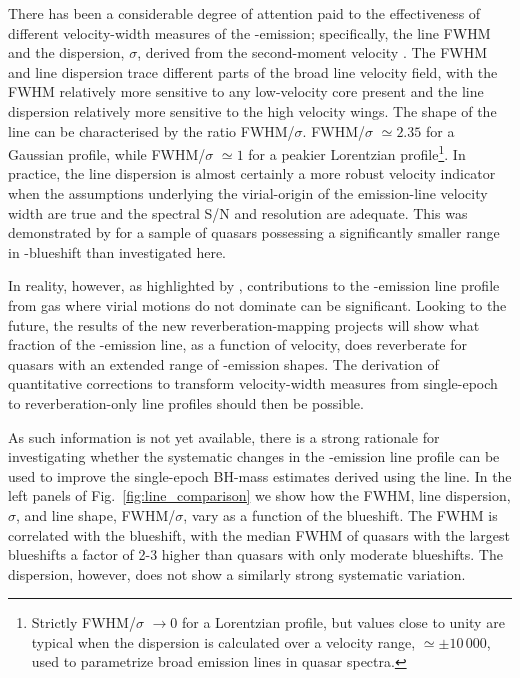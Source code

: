 There has been a considerable degree of attention paid to the effectiveness of different velocity-width measures of the -emission; specifically, the line FWHM and the dispersion, $\sigma$, derived from the second-moment velocity \citep[e.g.][]{assef11, denney13}.
The FWHM and line dispersion trace different parts of the broad line velocity field, with the FWHM relatively more sensitive to any low-velocity core present and the line dispersion relatively more sensitive to the high velocity wings. 
The shape of the line can be characterised by the ratio FWHM/$\sigma$. 
FWHM/$\sigma$ $\simeq 2.35$ for a Gaussian profile, while FWHM/$\sigma$ $\simeq 1$ for a peakier Lorentzian profile\footnote{Strictly FWHM/$\sigma$ $\rightarrow 0$ for a Lorentzian profile, but values close to unity are typical when the dispersion is calculated over a velocity range, $\simeq\pm10\,000$\kms, used to parametrize broad emission lines in quasar spectra.}.
In practice, the line dispersion is almost certainly a more robust velocity indicator when the assumptions underlying the virial-origin of the emission-line velocity width are true and the spectral S/N and resolution are adequate.
This was demonstrated by \citet{denney13} for a sample of quasars possessing a significantly smaller range in -blueshift than investigated here.

In reality, however, as highlighted by \citet{denney12}, contributions to the -emission line profile from gas where virial motions do not dominate can be significant. 
Looking to the future, the results of the new reverberation-mapping projects \citep{shen15, kingoz15} will show what fraction of the -emission line, as a function of velocity, does reverberate for quasars with an extended range of -emission shapes. 
The derivation of quantitative corrections to transform velocity-width measures from single-epoch to reverberation-only line profiles should then be possible. 

As such information is not yet available, there is a strong rationale for investigating whether the systematic changes in the -emission line profile can be used to improve the single-epoch BH-mass estimates derived using the  line. 
In the left panels of Fig.~\ref{fig:line_comparison} we show how the  FWHM, line dispersion, $\sigma$, and line shape, FWHM/$\sigma$, vary as a function of the blueshift. 
The  FWHM is correlated with the blueshift, with the median FWHM of quasars with the largest blueshifts a factor of 2-3 higher than quasars with only moderate blueshifts.
The dispersion, however, does not show a similarly strong systematic variation. 

